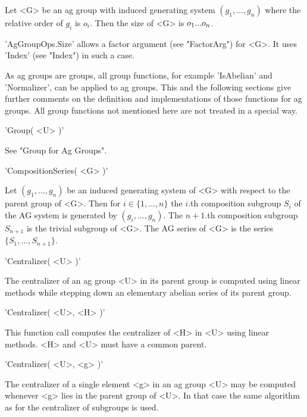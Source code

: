 Let <G> be an ag  group with  induced generating system $(g_1, ..., g_n)$
where the relative order of $g_i$ is $o_i$.  Then the size of <G> is $o_1
\* ... \* o_n$.

'AgGroupOps.Size' allows a factor argument (see "FactorArg") for <G>.  It
uses 'Index' (see "Index") in such a case.


%

As ag groups are groups, all group functions, for example 'IsAbelian' and
'Normalizer',  can  be applied  to ag groups.   This  and  the  following
sections give further comments on  the  definition and implementations of
those functions  for ag groups.  All  group functions not  mentioned here
are not treated in a special way.

\vspace{5mm}
'Group( <U> )'%

See "Group for Ag Groups".

\vspace{5mm}
'CompositionSeries( <G> )'

Let $(g_1, ..., g_n)$ be an induced generating system of <G> with respect
to the parent  group  of <G>.  Then  for $i\in  \{1,...,n\}$  the  $i$.th
composition  subgroup  $S_i$  of the  AG system  is generated  by  $(g_i,
...,g_n)$.   The $n+1$.th composition subgroup $S_{n+1}$  is the  trivial
subgroup  of  <G>.   The  AG series  of <G>  is the  series  $\{S_1, ...,
S_{n+1}\}$.

\vspace{5mm}
'Centralizer( <U> )'%

The centralizer of an ag group <U> in  its parent group is computed using
linear methods while stepping down  an elementary  abelian  series of its
parent group.

\vspace{5mm}
'Centralizer( <U>, <H> )'

This function call computes the  centralizer  of  <H> in <U> using linear
methods. <H> and <U> must have a common parent.

\vspace{5mm}
'Centralizer( <U>, <g> )'

The centralizer  of a  single  element <g>  in an  ag  group  <U>  may be
computed whenever <g> lies in the parent group of <U>. In that  case  the
same algorithm as for the centralizer of subgroups is used.

